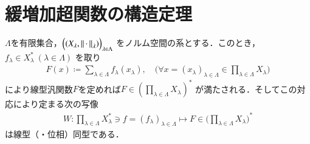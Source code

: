 \section{緩増加超関数の構造定理}
	\begin{screen}
		\begin{lem}\label{lem:isomorphism_on_product_of_dual_spaces}
			$\Lambda$を有限集合，$\Bigl( (X_\lambda,\left\|\, \cdot\, \right\|_{\lambda}) \Bigr)_{\lambda \in \Lambda}$
			をノルム空間の系とする．このとき，$f_\lambda \in X^*_\lambda\ (\lambda \in \Lambda)$
			を取り
			\begin{align}
				F(x) \coloneqq \sum_{\lambda \in \Lambda} f_\lambda(x_\lambda),
				\quad \biggl(\forall x = (x_\lambda)_{\lambda \in \Lambda} \in \prod_{\lambda \in \Lambda} X_\lambda \biggr)
				\label{eq:lem_isomorphism_on_product_of_dual_spaces}
			\end{align}
			により線型汎関数$F$を定めれば$F \in \left( \prod_{\lambda \in \Lambda} X_\lambda \right)^*$
			が満たされる．そしてこの対応により定まる次の写像
			\begin{align}
				W:\prod_{\lambda \in \Lambda} X_\lambda^* \ni f = (f_\lambda)_{\lambda \in \Lambda}
				\longmapsto F \in \Biggl( \prod_{\lambda \in \Lambda} X_\lambda \Biggr)^*
			\end{align}
			は線型（・位相）同型である．
		\end{lem}
	\end{screen}
	

